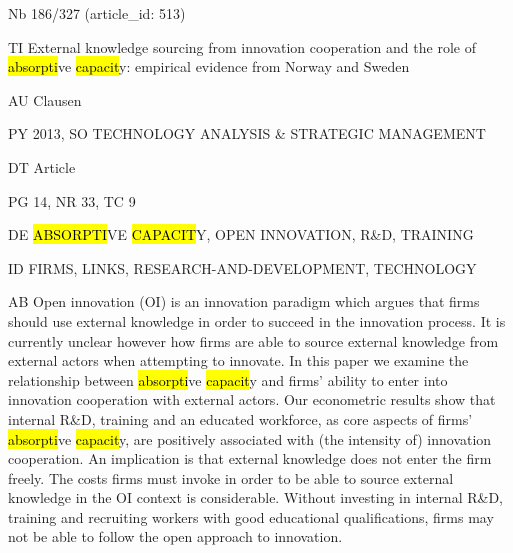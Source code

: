 \documentclass[a4paper]{article}
\begin{document}
\vspace*{-2cm}
Nb \tabto{0cm}186/327 (article\_id: 513)\par
TI \tabto{0cm}External knowledge sourcing from innovation cooperation and the role of \hl{absorpti}ve \hl{capacit}y: empirical evidence from Norway and Sweden\par
AU \tabto{0cm}Clausen\par
PY \tabto{0cm}2013, SO TECHNOLOGY ANALYSIS \& STRATEGIC MANAGEMENT\par
DT \tabto{0cm}Article\par
PG \tabto{0cm}14, NR 33, TC 9\par
DE \tabto{0cm}\hl{ABSORPTI}VE \hl{CAPACIT}Y, OPEN INNOVATION, R\&D, TRAINING\par
ID \tabto{0cm}FIRMS, LINKS, RESEARCH-AND-DEVELOPMENT, TECHNOLOGY\par
AB \tabto{0cm}Open innovation (OI) is an innovation paradigm which argues that firms should use external knowledge in order to succeed in the innovation process. It is currently unclear however how firms are able to source external knowledge from external actors when attempting to innovate. In this paper we examine the relationship between \hl{absorpti}ve \hl{capacit}y and firms' ability to enter into innovation cooperation with external actors. Our econometric results show that internal R\&D, training and an educated workforce, as core aspects of firms' \hl{absorpti}ve \hl{capacit}y, are positively associated with (the intensity of) innovation cooperation. An implication is that external knowledge does not enter the firm freely. The costs firms must invoke in order to be able to source external knowledge in the OI context is considerable. Without investing in internal R\&D, training and recruiting workers with good educational qualifications, firms may not be able to follow the open approach to innovation.\par
\clearpage
\end{document}
